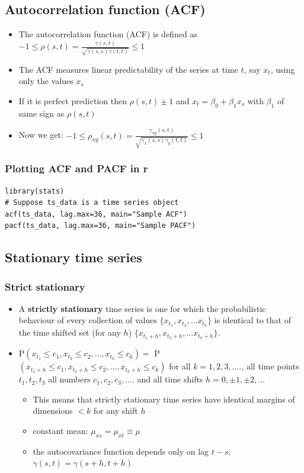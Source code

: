 \documentclass{article}
\begin{document}
\subsection{Autocorrelation function (ACF)}
\begin{itemize}
    \item The autocorrelation function (ACF) is defined as
    \subitem $-1 \leq \rho(s,t) = \frac{\gamma(s,t)}{\sqrt{\gamma(s,s) \gamma(t,t)}} \leq 1$
    \item The ACF measures linear predictability of the series at time $t$, say $x_t$, using only the values $x_s$
    \item If it is perfect prediction then $\rho (s,t) \pm 1$ and
    \subitem $x_t = \beta_0 + \beta_1 x_s$ with $\beta_1$ of same sign as $\rho(s,t)$
    \item Now we get:
    \subitem $-1 \leq \rho_{xy}(s,t) = \frac{\gamma_{xy}(s,t)}{\sqrt{\gamma_x(s,s) \gamma_y(t,t)}} \leq 1$
\end{itemize}



\subsubsection{Plotting ACF and PACF in r}
\begin{lstlisting}
library(stats)
# Suppose ts_data is a time series object
acf(ts_data, lag.max=36, main="Sample ACF")
pacf(ts_data, lag.max=36, main="Sample PACF")
\end{lstlisting}

\subsection{Stationary time series}

\subsubsection{Strict stationary}
\begin{itemize}
    \item A \textbf{strictly stationary} time series is one for which the probabilistic behaviour of every collection of values $\{x_{t_1}, x_{t_2}, ... x_{t_k}\}$ is identical to that of the time shifted set (for any $h$) $\{x_{t_1 + h}, x_{t_2 + h}, ... x_{t_k + h}\}$.
    \item P$(x_{t_1} \leq c_1, x_{t_2} \leq c_2, ..., x_{t_k} \leq c_k) = $ P$(x_{t_1 + h} \leq c_1, x_{t_2+ h} \leq c_2, ..., x_{t_k + h} \leq c_k)$ for all $k = 1,2,3, ....$, all time points $t_1, t_2, t_3$ all numbers $c_1, c_2, c_3,....$ and all time shifts $h = 0, \pm 1, \pm2 , ...$
    \begin{itemize}
        \item This means that strictly stationary time series have identical margins of dimensions $< k$ for any shift $h$
        \item constant mean: $\mu_{xs} = \mu_{xt} \equiv \mu$
        \item the autocovariance function depends only on lag $t - s$: $\gamma (s,t) = \gamma(s+h,t+h)$
    \end{itemize}
\end{itemize}
\end{document}
